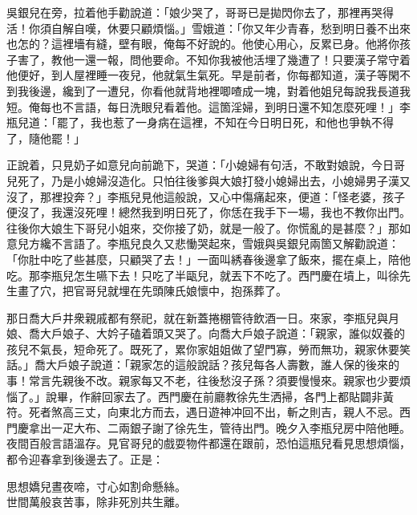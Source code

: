吳銀兒在旁，拉着他手勸說道：「娘少哭了，哥哥已是拋閃你去了，那裡再哭得活！你須自解自嘆，休要只顧煩惱。」雪娥道：「你又年少青春，愁到明日養不出來也怎的？這裡墻有縫，壁有眼，俺每不好說的。他使心用心，反累已身。他將你孩子害了，教他一還一報，問他要命。不知你我被他活埋了幾遭了！只要漢子常守着他便好，到人屋裡睡一夜兒，他就氣生氣死。早是前者，你每都知道，漢子等閑不到我後邊，纔到了一遭兒，你看他就背地裡唧喳成一塊，對着他姐兒每說我長道我短。俺每也不言語，每日洗眼兒看着他。這箇淫婦，到明日還不知怎麼死哩！」{}李瓶兒道：「罷了，我也惹了一身病在這裡，不知在今日明日死，和他也爭執不得了，隨他罷！」

正說着，只見奶子如意兒向前跪下，哭道：「小媳婦有句活，不敢對娘說，今日哥兒死了，乃是小媳婦沒造化。只怕往後爹與大娘打發小媳婦出去，小媳婦男子漢又沒了，那裡投奔？」李瓶兒見他這般說，又心中傷痛起來，便道：「怪老婆，孩子便沒了，我還沒死哩！總然我到明日死了，你恁在我手下一場，我也不教你出門。往後你大娘生下哥兒小姐來，交你接了奶，就是一般了。你慌亂的是甚麼？」那如意兒方纔不言語了。李瓶兒良久又悲慟哭起來，雪娥與吳銀兒兩箇又解勸說道：「你肚中吃了些甚麼，只顧哭了去！」一面叫綉春後邊拿了飯來，擺在桌上，陪他吃。那李瓶兒怎生嚥下去！只吃了半甌兒，就丟下不吃了。西門慶在墳上，叫徐先生畫了穴，把官哥兒就埋在先頭陳氏娘懷中，抱孫葬了。

那日喬大戶井衆親戚都有祭祀，就在新蓋捲棚管待飲酒一日。來家，李瓶兒與月娘、喬大戶娘子、大妗子磕着頭又哭了。向喬大戶娘子說道：「親家，誰似奴養的孩兒不氣長，短命死了。既死了，累你家姐姐做了望門寡，勞而無功，親家休要笑話。」喬大戶娘子說道：「親家怎的這般說話？孩兒每各人壽數，誰人保的後來的事！常言先親後不改。親家每又不老，往後愁沒子孫？須要慢慢來。親家也少要煩惱了。」說畢，作辭回家去了。西門慶在前廳教徐先生洒掃，各門上都貼闢非黃符。死者煞高三丈，向東北方而去，遇日遊神冲回不出，斬之則吉，親人不忌。西門慶拿出一疋大布、二兩銀子謝了徐先生，管待出門。晚夕入李瓶兒房中陪他睡。夜間百般言語溫存。見官哥兒的戲耍物件都還在跟前，恐怕這瓶兒看見思想煩惱，都令迎春拿到後邊去了。正是：

\begin{myquote} 
思想嬌兒晝夜啼，寸心如割命懸絲。\\世間萬般哀苦事，除非死別共生離。
\end{myquote} 

